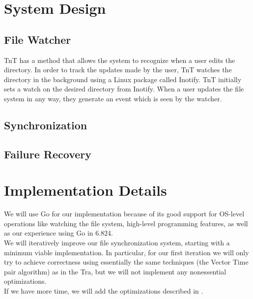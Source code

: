 \section{System Design}

\subsection{File Watcher}
TnT has a method that allows the system to recognize when a user edits the directory.  In order to track the updates made by the user, TnT watches
the directory in the background using a Linux package called Inotify.  TnT initially sets a watch on the desired directory from Inotify.  When a 
user updates the file system in any way, they generate an event which is seen by the watcher.

\subsection{Synchronization}

\subsection{Failure Recovery}


\section{Implementation Details}
We will use Go for our implementation because of its good support for OS-level operations like watching the file system, high-level programming features, as well as our experience using Go in 6.824.\\

\noindent We will iteratively improve our file synchronization system, starting with a minimum viable implementation.  In particular, for our first iteration we will only try to achieve correctness using essentially the same techniques (the Vector Time pair algorithm) as in the Tra, but we will not implement any nonessential optimizations.\\

\noindent If we have more time, we will add the optimizations described in \cite{tra-tech-report}.

